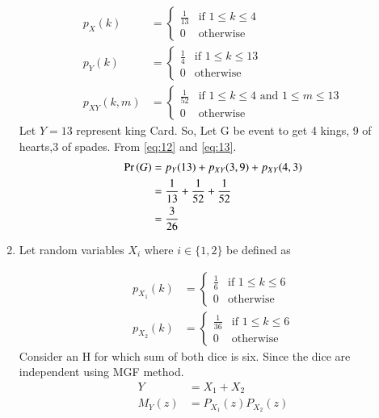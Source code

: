 \documentclass[journal,12pt,twocolumn]{IEEEtran}
\theoremstyle{remark}
\begin{document}
\begin{enumerate}
\begin{align}
p_{X}(k) &= 
        \begin{cases}
            \frac{1}{13} & \text{if }1 \leq k \leq 4\\
            0 & \text{otherwise}
        \end{cases}\label{eq:11}\\
        p_{Y}(k) &= 
        \begin{cases}
            \frac{1}{4} & \text{if }1 \leq k \leq 13 \\
            0 & \text{otherwise}
        \end{cases}\label{eq:12}\\
p_{XY}(k,m) &= 
        \begin{cases}
            \frac{1}{52} & \text{if }1 \leq k \leq 4 \text{ and }1 \leq m \leq 13 \\
            0 & \text{otherwise}
        \end{cases}\label{eq:13}
    \end{align}
Let $Y=13$ represent king Card. So, Let G be event to get 4 kings, 9 of hearts,3 of spades. From \eqref{eq:12} and \eqref{eq:13}.
\begin{align}
\Pr\left(G\right)&=p_{Y}(13)+p_{XY}(3,9)+p_{XY}(4,3)\\
&=\frac{1}{13}+\frac{1}{52}+\frac{1}{52}\\
&=\frac{3}{26}
\end{align}
\item  Let random variables $X_i$ where $i \in \{1,2\}$ be defined as
\begin{table}[!ht]
	
\end{table}
\begin{align}
        p_{X_1}(k) &= 
        \begin{cases}
            \frac{1}{6} & \text{if }1 \leq k \leq 6 \\
            0 & \text{otherwise}
        \end{cases}\\
         p_{X_2}(k) &= 
        \begin{cases}
            \frac{1}{36} & \text{if }1 \leq k \leq 6 \\
            0 & \text{otherwise}
        \end{cases}
    \end{align}
Consider an H for which sum of both dice is six. Since the dice are independent using MGF method.
  \begin{align}
Y&=X_1+X_2\\
M_Y(z)&=P_{X_1}(z)P_{X_2}(z)\\

\end{align}
\end{enumerate}
\end{document}
